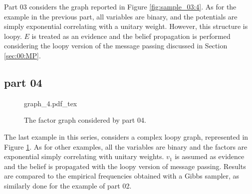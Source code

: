 Part 03 considers the graph reported in Figure \ref{fig:sample_03:4}. As for the example in the previous part, all variables are binary, and the potentials are simply exponential correlating with a unitary weight. However, this structure is loopy. $E$ is treated as an evidence and the belief propagation is performed considering the loopy version of the message passing discussed in Section \ref{sec:00:MP}. 

\subsection{part 04}
\label{sec:Sample_03_part_04}

\begin{figure}
	\centering
\def\svgwidth{0.6 \textwidth}
{graph_4.pdf_tex} 
\caption{The factor graph considered by part 04.}
\label{fig:sample_03:5}
\end{figure}

The last example in this series, considers a complex loopy graph, represented in Figure \ref{fig:sample_03:5}. As for other examples, all the variables are binary and the factors are exponential simply correlating with unitary weights. $v_1$ is assumed as evidence and the belief is propagated with the loopy version of message passing. Results are compared to the empirical frequencies obtained with a Gibbs sampler, as similarly done for the example of part 02.



